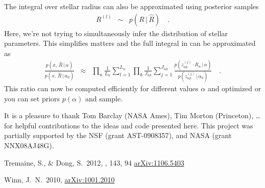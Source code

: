 \documentclass[12pt,preprint]{aastex}
\begin{document}
The integral over stellar radius can also be approximated using posterior
samples
\begin{eqnarray}
R^{(l)} &\sim& p(R\,|\,\hat{R}) \quad.
\end{eqnarray}
Here, we're not trying to simultaneously infer the distribution of stellar
parameters.
This simplifies matters and the full integral in  can be
approximated as
\begin{eqnarray}
\frac{p(x,\,\hat{R}\,|\,\alpha)}{p(x,\,\hat{R}\,|\,\alpha_0)}
&\approx& \prod_n \frac{1}{L_n} \sum_{l=1}^{L_n} \prod_k
\frac{1}{J_{nk}} \sum_{j=1}^{J_{nk}}
\frac{p(z_{nk}^{(j)}\cdot R_n\,|\,\alpha)}{p(z_{nk}^{(j)}\,|\,\alpha_0)}
\quad.
\end{eqnarray}
This ratio can now be computed efficiently for different values $\alpha$ and
optimized or you can set priors $p(\alpha)$ and sample.

\acknowledgments
It is a pleasure to thank
    Tom Barclay (NASA Ames),
    Tim Morton (Princeton),
    \ldots
for helpful contributions to the ideas and code presented here.
This project was partially supported by the NSF (grant AST-0908357), and NASA
(grant NNX08AJ48G).

\newcommand{\arxiv}[1]{\href{http://arxiv.org/abs/#1}{arXiv:#1}}
\begin{thebibliography}{}\raggedright

Tremaine, S., \& Dong, S.\ 2012, \aj, 143, 94
\arxiv{1106.5403}

Winn, J.~N.\ 2010, \arxiv{1001.2010}

\end{thebibliography}
\end{document}
